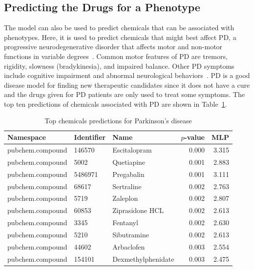 \subsection{Predicting the Drugs for a Phenotype}

The model can also be used to predict chemicals that can be associated with phenotypes.
Here, it is used to predict chemicals that might best affect \ac{PD}, a progressive neurodegenerative disorder that affects motor and non-motor functions in variable degrees~\cite{jankovic_parkinsons_2008}.
Common motor features of \ac{PD} are tremors, rigidity, slowness (bradykinesia), and impaired balance.
Other \ac{PD} symptoms include cognitive impairment and abnormal neurological behaviors~\cite{jankovic_parkinsons_2008}. 
\ac{PD} is a good disease model for finding new therapeutic candidates since it does not have a cure and the drugs given for \ac{PD} patients are only used to treat some symptoms.
The top ten predictions of chemicals associated with \ac{PD} are shown in Table~\ref{tab:phenotype_drug}.

\begin{table}[!hb]
    \centering
    \begin{tabular}{|l|l|l|r|r|}
        \hline
        \textbf{Namespace} & \textbf{Identifier} & \textbf{Name} & \textbf{$p$-value} & \textbf{MLP} \\
        \hline
        pubchem.compound & 146570 & Escitalopram & 0.000 & 3.315 \\
        \hline
        pubchem.compound & 5002 & Quetiapine & 0.001 & 2.883 \\
        \hline
        pubchem.compound & 5486971 & Pregabalin & 0.001 & 3.111 \\
        \hline
        pubchem.compound & 68617 & Sertraline & 0.002 & 2.763 \\
        \hline
        pubchem.compound & 5719 & Zaleplon & 0.002 & 2.807 \\
        \hline
        pubchem.compound & 60853 & Ziprasidone HCL & 0.002 & 2.613 \\
        \hline
        pubchem.compound & 3345 & Fentanyl & 0.002 & 2.630 \\
        \hline
        pubchem.compound & 5210 & Sibutramine & 0.002 & 2.613 \\
        \hline
        pubchem.compound & 44602 & Arbaclofen & 0.003 & 2.554 \\
        \hline
        pubchem.compound & 154101 & Dexmethylphenidate & 0.003 & 2.475 \\
        \hline
    \end{tabular}
    \captionsetup{justification=centering}
    \caption{Top chemicals predictions for Parkinson's disease}
    \label{tab:phenotype_drug}
\end{table}

